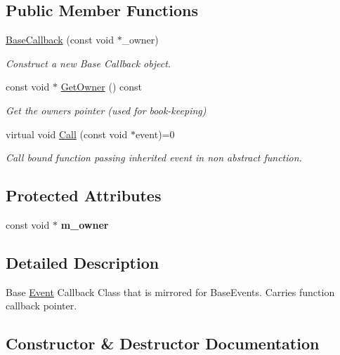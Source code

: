 \subsection*{Public Member Functions}
\begin{DoxyCompactItemize}
\item 
\hyperlink{classBaseCallback_a9071b9dda8d9a997937670f7ec4edcea}{Base\+Callback} (const void $\ast$\+\_\+owner)
\begin{DoxyCompactList}\small\item\em Construct a new Base Callback object. \end{DoxyCompactList}\item 
const void $\ast$ \hyperlink{classBaseCallback_ad9ea4e795a92a1c91b38596dbca29da3}{Get\+Owner} () const
\begin{DoxyCompactList}\small\item\em Get the owner\textquotesingle{}s pointer (used for book-\/keeping) \end{DoxyCompactList}\item 
virtual void \hyperlink{classBaseCallback_af87d16a88aaf3c429e5f020798f97a8b}{Call} (const void $\ast$event)=0
\begin{DoxyCompactList}\small\item\em Call bound function passing inherited event in non abstract function. \end{DoxyCompactList}\end{DoxyCompactItemize}
\subsection*{Protected Attributes}
\begin{DoxyCompactItemize}
\item 
\mbox{\label{classBaseCallback_a9f44b039af4ffe1c7bcdeaddd10e2bbd}} 
const void $\ast$ {\bfseries m\+\_\+owner}
\end{DoxyCompactItemize}


\subsection{Detailed Description}
Base \hyperlink{classEvent}{Event} Callback Class that is mirrored for Base\+Events. Carries function callback pointer. 

\subsection{Constructor \& Destructor Documentation}
\mbox{\label{classBaseCallback_a9071b9dda8d9a997937670f7ec4edcea}} 
